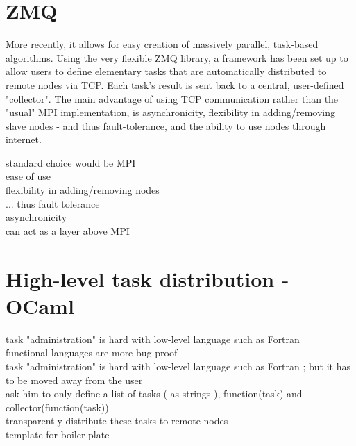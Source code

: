 \section{ZMQ}
More recently, it allows for easy creation of massively parallel, task-based algorithms.
Using the very flexible ZMQ library, a framework has been set up to allow users to define elementary tasks that are automatically distributed to remote nodes via TCP. Each task's result is sent back to a central, user-defined "collector". The main advantage of using TCP communication rather than the "usual" MPI implementation, is asynchronicity, flexibility in adding/removing slave nodes - and thus fault-tolerance, and the ability to use nodes through internet.


standard choice would be MPI \\
ease of use \\
flexibility in adding/removing nodes \\
... thus fault tolerance \\
asynchronicity \\
can act as a layer above MPI \\
\section{High-level task distribution - OCaml}
task "administration" is hard with low-level language such as Fortran \\
functional languages are more bug-proof \\

task "administration" is hard with low-level language such as Fortran ; but it has to be moved away from the user \\
ask him to only define a list of tasks ( as strings ), function(task) and collector(function(task)) \\
transparently distribute these tasks to remote nodes \\
template for boiler plate \\
